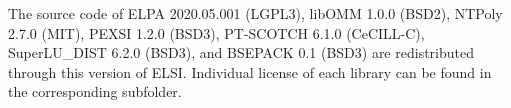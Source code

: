\documentclass{report}
\begin{document}
The source code of ELPA 2020.05.001 (LGPL3), libOMM 1.0.0 (BSD2), NTPoly 2.7.0 (MIT), PEXSI 1.2.0 (BSD3), PT-SCOTCH 6.1.0 (CeCILL-C), SuperLU\_DIST 6.2.0 (BSD3), and BSEPACK 0.1 (BSD3) are redistributed through this version of ELSI. Individual license of each library can be found in the corresponding subfolder.
\end{document}
